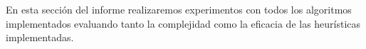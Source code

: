 En esta sección del informe realizaremos experimentos con todos los algoritmos implementados evaluando tanto la complejidad como la eficacia de las heurísticas implementadas.




